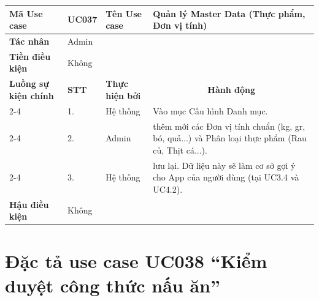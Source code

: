 \begin{longtable}{|p{2.7cm}|p{0.8cm}|p{2.6cm}|p{7.3cm}|}
\hline
\cellcolor[HTML]{D5F5E3}\textbf{Mã Use case} & \multicolumn{1}{l|}{UC037} & \cellcolor[HTML]{D5F5E3}\textbf{Tên Use case} & Quản lý Master Data (Thực phẩm, Đơn vị tính) \\ \hline
\cellcolor[HTML]{D5F5E3}\textbf{Tác nhân} & \multicolumn{3}{p{10.7cm}|}{Admin} \\ \hline
\cellcolor[HTML]{D5F5E3}\textbf{Tiền điều kiện} & \multicolumn{3}{p{10.7cm}|}{Không} \\ \hline

\cellcolor[HTML]{D5F5E3}\textbf{Luồng sự kiện chính} & \cellcolor[HTML]{FDEBD0}\textbf{STT} & \cellcolor[HTML]{FDEBD0}\textbf{Thực hiện bởi} & \multicolumn{1}{c|}{\cellcolor[HTML]{FDEBD0}\textbf{Hành động}} \\ \cline{2-4} 
\cellcolor[HTML]{D5F5E3} & 1. & Hệ thống & Vào mục Cấu hình Danh mục. \\ \cline{2-4} 
\cellcolor[HTML]{D5F5E3} & 2. & Admin & thêm mới các Đơn vị tính chuẩn (kg, gr, bó, quả...) và Phân loại thực phẩm (Rau củ, Thịt cá...). \\ \cline{2-4} 
\cellcolor[HTML]{D5F5E3} & 3. & Hệ thống & lưu lại. Dữ liệu này sẽ làm cơ sở gợi ý cho App của người dùng (tại UC3.4 và UC4.2). \\ \hline

\cellcolor[HTML]{D5F5E3}\textbf{Hậu điều kiện} & \multicolumn{3}{p{10.7cm}|}{Không} \\ \hline
\end{longtable}
\endgroup

\section{Đặc tả use case UC038 ``Kiểm duyệt công thức nấu ăn''}
\vspace{0.5cm}

\begingroup
\renewcommand{\arraystretch}{1.5}

